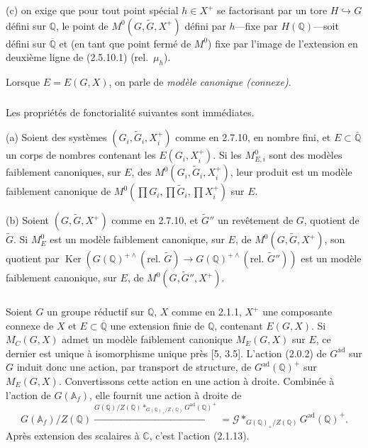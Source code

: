 \documentclass[12pt,a4paper]{article}
\theoremstyle{plain}
\theoremstyle{definition}
\theoremstyle{remark}
\DeclareMathOperator{\Ker}{Ker}
\newcommand{\QQ}{\mathbb{Q}}
\newcommand{\CC}{\mathbb{C}}
\newcommand{\Af}{\mathbb{A}_f}
\begin{document}
(c) on exige que pour tout point sp\'ecial $h \in X^+$ se factorisant par un tore $H \hookrightarrow G$ d\'efini sur $\QQ$, le point de $M^0(G,\tilde{G},X^+)$ d\'efini par $h$---fixe par $H(\QQ)$---soit d\'efini sur $\overline{\QQ}$ et (en tant que point ferm\'e de $M^0$) fixe par l'image de l'extension en deuxi\`eme ligne de (2.5.10.1) (rel.~$\mu_h$).

Lorsque $E = E(G,X)$, on parle de \textit{mod\`ele canonique (connexe)}.

\subsubsection{}

Les propri\'et\'es de fonctorialit\'e suivantes sont imm\'ediates.

(a) Soient des syst\`emes $(G_i, \tilde{G}_i, X_i^+)$ comme en 2.7.10, en nombre fini, et $E \subset \overline{\QQ}$ un corps de nombres contenant les $E(G_i, X_i^+)$. Si les $M^0_{E,i}$ sont des mod\`eles faiblement canoniques, sur $E$, des $M^0(G_i, \tilde{G}_i, X_i^+)$, leur produit est un mod\`ele faiblement canonique de $M^0(\prod G_i, \prod \tilde{G}_i, \prod X_i^+)$ sur $E$.

(b) Soient $(G, \tilde{G}, X^+)$ comme en 2.7.10, et $\tilde{G}''$ un rev\^etement de $G$, quotient de $\tilde{G}$. Si $M^0_E$ est un mod\`ele faiblement canonique, sur $E$, de $M^0(G, \tilde{G}, X^+)$, son quotient par $\Ker(G(\QQ)^{+\wedge}(\text{rel.~}\tilde{G}) \to G(\QQ)^{+\wedge}(\text{rel.~}\tilde{G}''))$ est un mod\`ele faiblement canonique, sur $E$, de $M^0(G, \tilde{G}'', X^+)$.

\subsubsection{}

Soient $G$ un groupe r\'eductif sur $\QQ$, $X$ comme en 2.1.1, $X^+$ une composante connexe de $X$ et $E \subset \overline{\QQ}$ une extension finie de $\QQ$, contenant $E(G,X)$. Si $M_C(G,X)$ admet un mod\`ele faiblement canonique $M_E(G,X)$ sur $E$, ce dernier est unique \`a isomorphisme unique pr\`es [5, 3.5]. L'action (2.0.2) de $G^{\text{ad}}$ sur $G$ induit donc une action, par transport de structure, de $G^{\text{ad}}(\QQ)^+$ sur $M_E(G,X)$. Convertissons cette action en une action \`a droite. Combin\'ee \`a l'action de $G(\Af)$, elle fournit une action \`a droite de
\[
G(\Af)/Z(\QQ) \xrightarrow{G(\QQ)/Z(\QQ) *_{G(\QQ)_+/Z(\QQ)} G^{\text{ad}}(\QQ)^+} = \mathscr{G} *_{G(\QQ)_+/Z(\QQ)} G^{\text{ad}}(\QQ)^+.
\]
Apr\`es extension des scalaires \`a $\CC$, c'est l'action (2.1.13).
\end{document}
